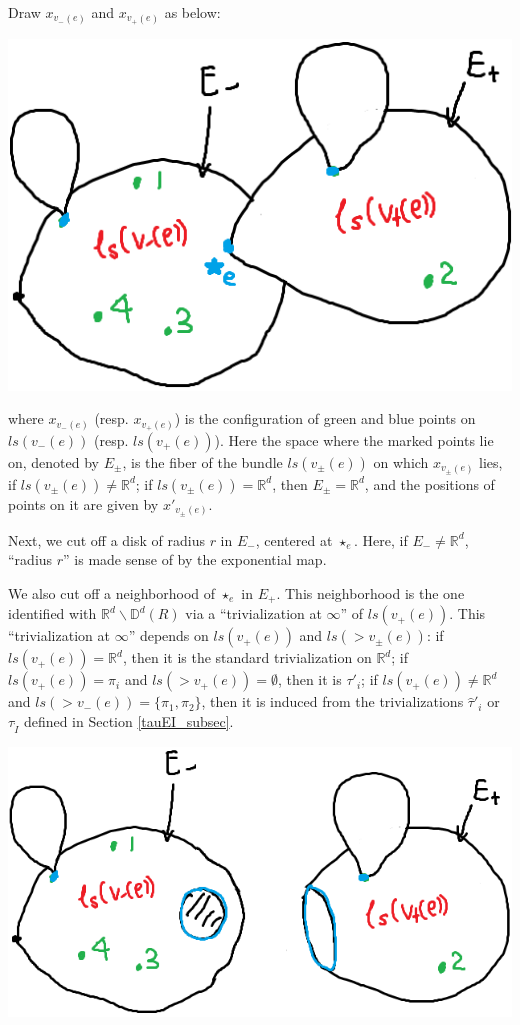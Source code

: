 \documentclass[11pt]{article}
\theoremstyle{definition}
\theoremstyle{remark}
\def\R{\mathbb{R}}
\def\D{\mathbb{D}}
\def\rI{{\mathring{I}}}
\begin{document}
Draw $x_{v_-(e)}$ and $x_{v_+(e)}$ as below: 

\includegraphics[scale=0.5]{yedfn1_fig}

where $x_{v_-(e)}$ (resp. $x_{v_+(e)}$) is the configuration of green and blue points on $ls(v_-(e))$ (resp. $ls(v_+(e))$). 
Here the space where the marked points lie on, denoted by $E_\pm$, is the fiber of the bundle $ls(v_\pm(e))$ on which $x_{v_\pm(e)}$ lies, if $ls(v_\pm(e))\neq\R^d$; if $ls(v_{\pm}(e))=\R^d$, then $E_\pm=\R^d$, and the positions of points on it are given by $x'_{v_\pm(e)}$. 

Next, we cut off a disk of radius $r$ in $E_-$, centered at $\star_e$. Here, if $E_-\neq\R^d$, ``radius $r$'' is made sense of by the exponential map. 

We also cut off a neighborhood of $\star_e$ in $E_+$. This neighborhood is the one identified with $\R^d\backslash\D^d(R)$ via a ``trivialization at $\infty$'' of $ls(v_+(e))$. This ``trivialization at $\infty$'' depends on $ls(v_+(e))$ and $ls(>v_\pm(e))$: if $ls(v_+(e))=\R^d$, then it is the standard trivialization on $\R^d$; if $ls(v_+(e))=\pi_i$ and $ls(>v_+(e))=\emptyset$, then it is $\tau'_i$; if $ls(v_+(e))\neq\R^d$ and $ls(>v_-(e))=\{\pi_1,\pi_2\}$, then it is induced from the trivializations $\hat\tau'_i$ or $\tau_\rI$ defined in Section \ref{tauEI_subsec}. 

\includegraphics[scale=0.5]{yedfn2_fig}
\end{document}
